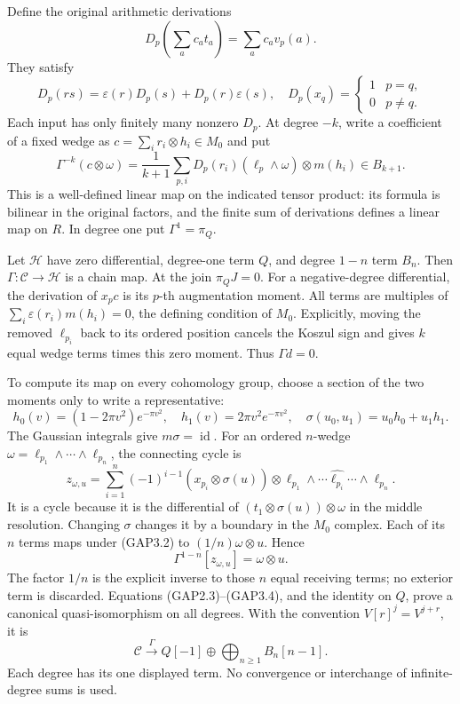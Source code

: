 Define the original arithmetic derivations \[
D_p\left(\sum_a c_at_a\right)=\sum_a c_av_p(a).
\] They satisfy \[
D_p(rs)=\varepsilon(r)D_p(s)+D_p(r)\varepsilon(s),
\quad D_p(x_q)=\begin{cases}1&p=q,\\0&p\ne q.\end{cases}
\tag{GAP3.1}
\] Each input has only finitely many nonzero \(D_p\). At degree \(-k\),
write a coefficient of a fixed wedge as
\(c=\sum_i r_i\otimes h_i\in M_0\) and put \[
\Gamma^{-k}(c\otimes\omega)
=\frac1{k+1}\sum_{p,i}D_p(r_i)
 (\ell_p\wedge\omega)\otimes m(h_i)\in B_{k+1}.
\tag{GAP3.2}
\] This is a well-defined linear map on the indicated tensor product:
its formula is bilinear in the original factors, and the finite sum of
derivations defines a linear map on \(R\). In degree one put
\(\Gamma^1=\pi_Q\).

Let \(\mathscr H\) have zero differential, degree-one term \(Q\), and
degree \(1-n\) term \(B_n\). Then \(\Gamma:\mathscr C\to\mathscr H\) is
a chain map. At the join \(\pi_QJ=0\). For a negative-degree
differential, the derivation of \(x_pc\) is its \(p\)-th augmentation
moment. All terms are multiples of \(\sum_i\varepsilon(r_i)m(h_i)=0\),
the defining condition of \(M_0\). Explicitly, moving the removed
\(\ell_{p_i}\) back to its ordered position cancels the Koszul sign and
gives \(k\) equal wedge terms times this zero moment. Thus
\(\Gamma d=0\).

To compute its map on every cohomology group, choose a section of the
two moments only to write a representative: \[
h_0(v)=(1-2\pi v^2)e^{-\pi v^2},\quad
h_1(v)=2\pi v^2e^{-\pi v^2},\quad
\sigma(u_0,u_1)=u_0h_0+u_1h_1.
\] The Gaussian integrals give \(m\sigma=\operatorname{id}\). For an
ordered \(n\)-wedge \(\omega=\ell_{p_1}\wedge\cdots\wedge\ell_{p_n}\),
the connecting cycle is \[
z_{\omega,u}=\sum_{i=1}^n(-1)^{i-1}
 (x_{p_i}\otimes\sigma(u))\otimes
 \ell_{p_1}\wedge\cdots\widehat{\ell_{p_i}}\cdots\wedge\ell_{p_n}.
\tag{GAP3.3}
\] It is a cycle because it is the differential of
\((t_1\otimes\sigma(u))\otimes\omega\) in the middle resolution.
Changing \(\sigma\) changes it by a boundary in the \(M_0\) complex.
Each of its \(n\) terms maps under (GAP3.2) to \((1/n)\omega\otimes u\).
Hence \[
\Gamma^{1-n}[z_{\omega,u}]=\omega\otimes u.
\tag{GAP3.4}
\] The factor \(1/n\) is the explicit inverse to those \(n\) equal
receiving terms; no exterior term is discarded. Equations
(GAP2.3)--(GAP3.4), and the identity on \(Q\), prove a canonical
quasi-isomorphism on all degrees. With the convention
\(V[r]^j=V^{j+r}\), it is \[
\mathscr C\xrightarrow{\Gamma}
Q[-1]\oplus\bigoplus_{n\ge1}B_n[n-1].
\tag{GAP3.5}
\] Each degree has its one displayed term. No convergence or interchange
of infinite-degree sums is used.

